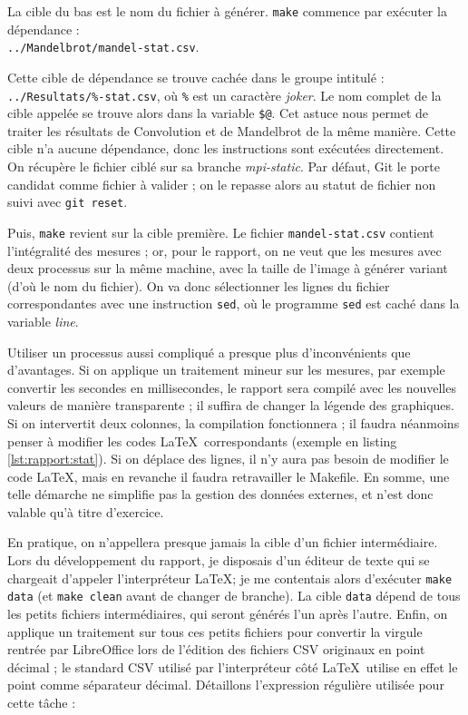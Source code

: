 La cible du bas est le nom du fichier à générer. \texttt{make}
commence par exécuter la dépendance :\\
\texttt{../Mandelbrot/mandel-stat.csv}.

Cette cible de dépendance se trouve cachée dans le groupe intitulé :\\
\texttt{../Resultats/\%-stat.csv}, où \texttt{\%} est un caractère
\emph{joker}. Le nom complet de la cible appelée se trouve alors dans
la variable \texttt{\$@}. Cet astuce nous permet de traiter les
résultats de Convolution et de Mandelbrot de la même manière. Cette
cible n'a aucune dépendance, donc les instructions sont ex\-écu\-tées
directement. On récupère le fichier ciblé sur sa branche
\emph{mpi-static}. Par défaut, Git le porte candidat comme fichier à
valider ; on le repasse alors au statut de fichier non suivi avec
\texttt{git reset}.

Puis, \texttt{make} revient sur la cible première. Le fichier
\texttt{mandel-stat.csv} contient l'intégralité des mesures ; or, pour
le rapport, on ne veut que les mesures avec deux processus sur la même
machine, avec la taille de l'image à générer variant (d'où le nom du
fichier). On va donc sélectionner les lignes du fichier
correspondantes avec une instruction \texttt{sed}, où le programme
\texttt{sed} est caché dans la variable \emph{line}.

Utiliser un processus aussi compliqué a presque plus d'inconvénients
que d'avantages. Si on applique un traitement mineur sur les mesures,
par exemple convertir les secondes en millisecondes, le rapport sera
compilé avec les nouvelles valeurs de manière transparente ; il
suffira de changer la légende des graphiques. Si on intervertit deux
colonnes, la compilation fonctionnera ; il faudra néanmoins penser à
modifier les codes \LaTeX\ correspondants (exemple en listing
\ref{lst:rapport:stat}). Si on déplace des lignes, il n'y aura pas
besoin de modifier le code \LaTeX, mais en revanche il faudra
retravailler le Makefile. En somme, une telle démarche ne simplifie
pas la gestion des données externes, et n'est donc valable qu'à titre
d'exercice.

En pratique, on n'appellera presque jamais la cible d'un fichier
intermédiaire. Lors du développement du rapport, je disposais d'un
éditeur de texte qui se chargeait d'appeler l'interpréteur \LaTeX ; je
me contentais alors d'exécuter \texttt{make data} (et \texttt{make
  clean} avant de changer de branche). La cible \texttt{data} dépend
de tous les petits fichiers intermédiaires, qui seront générés l'un
après l'autre. Enfin, on applique un traitement sur tous ces petits
fichiers pour convertir la virgule rentrée par LibreOffice lors de
l'édition des fichiers CSV originaux en point décimal ; le standard
CSV utilisé par l'interpréteur côté \LaTeX\ utilise en effet le point
comme séparateur décimal. Détaillons l'expression régulière utilisée
pour cette tâche :

